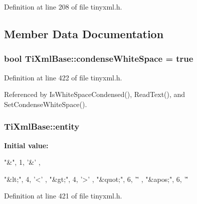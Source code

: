 Definition at line 208 of file tinyxml.h.

\subsection{Member Data Documentation}
\hypertarget{class_ti_xml_base_a447a05f6a3edbb7892f66f9df8244a3d}{
\subsubsection[{condenseWhiteSpace}]{\setlength{\rightskip}{0pt plus 5cm}bool {\bf TiXmlBase::condenseWhiteSpace} = true}}
\label{class_ti_xml_base_a447a05f6a3edbb7892f66f9df8244a3d}


Definition at line 422 of file tinyxml.h.

Referenced by IsWhiteSpaceCondensed(), ReadText(), and SetCondenseWhiteSpace().\hypertarget{class_ti_xml_base_aae956c75fedff20d337f7cc109c6b71a}{
\subsubsection[{entity}]{ {\bf TiXmlBase::entity}}}
\label{class_ti_xml_base_aae956c75fedff20d337f7cc109c6b71a}
{\bfseries Initial value:}
\begin{DoxyCode}

  {
    
    
    { "&",  1, '&' },
    

    { "&lt;",   4, '<' },
    { "&gt;",   4, '>' },
    { "&quot;", 6, '\"' },
    { "&apos;", 6, '\'' }
  }
\end{DoxyCode}


Definition at line 421 of file tinyxml.h.

